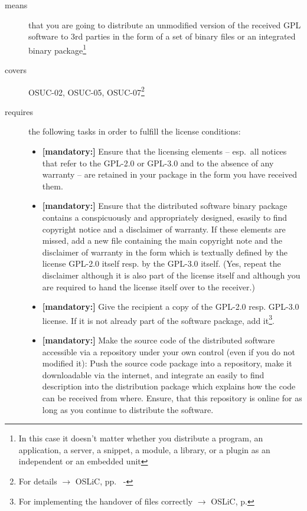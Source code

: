 \begin{description}
\item[means] that you are going to distribute an unmodified version of the
received GPL software to 3rd parties in the form of a set of binary files or an
integrated bi\-na\-ry package\footnote{In this case it doesn't matter whether
you  distribute a program, an application, a server, a snippet, a module, a
library, or a plugin as an independent or an embedded unit}

\item[covers] OSUC-02, OSUC-05, OSUC-07\footnote{For details $\rightarrow$ OSLiC, pp.\
\pageref{OSUC-02-DEF} - \pageref{OSUC-07-DEF}}

\item[requires] the following tasks in order to fulfill the license conditions:
\begin{itemize}
  
  \item \textbf{[mandatory:]} Ensure that the licensing elements -- esp.\ all
  notices that refer to the GPL-2.0 or GPL-3.0 and to the absence of any
  warranty -- are retained in your package in the form you have received them.

  \item \textbf{[mandatory:]} Ensure that the distributed software binary
  package contains a conspicuously and appropriately designed, esasily to find
  copyright notice and a disclaimer of warranty. If these elements are missed,
  add a new file containing the main copyright note and the disclaimer of
  warranty in the form which is textually defined by the license GPL-2.0 itself
  resp. by the GPL-3.0 itself. (Yes, repeat the disclaimer although it is also
  part of the license itself and although you are required to hand the license
  itself over to the receiver.)
  
  \item \textbf{[mandatory:]} Give the recipient a copy of the GPL-2.0 resp.
  GPL-3.0 license. If it is not already part of the software package, add
  it\footnote{For implementing the handover of files correctly $\rightarrow$
  OSLiC, p. \pageref{DistributingFilesHint}}.
  
  \item \textbf{[mandatory:]} Make the source code of the distributed software
  accessible via a repository under your own control (even if you do not
  modified it): Push the source code package into a repository, make it
  downloadable via the internet, and integrate an easily to find description
  into the distribution package which explains how the code can be received from
  where. Ensure, that this repository is online for as long as you continue to
  distribute the software.
  

\end{itemize}
\end{description}
